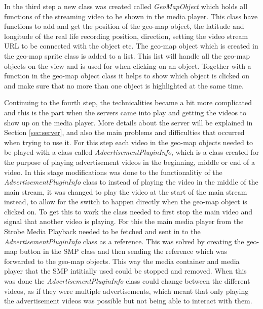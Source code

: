 In the third step a new class was created called \textit{GeoMapObject} which holds all functions of the streaming video to be shown in the media player. This class have functions to add and get the position of the geo-map object, the latitude and longitude of the real life recording position, direction, setting the video stream URL to be connected with the object etc. The geo-map object which is created in the geo-map sprite class is added to a list. This list will handle all the geo-map objects on the view and is used for when clicking on an object. Together with a function in the geo-map object class it helps to show which object is clicked on and make sure that no more than one object is highlighted at the same time.

Continuing to the fourth step, the technicalities became a bit more complicated and this is the part when the servers came into play and getting the videos to show up on the media player. More details about the server will be explained in Section \ref{sec:server}, and also the main problems and difficulties that occurred when trying to use it. For this step each video in the geo-map objects needed to be played with a class called \textit{AdvertisementPluginInfo}, which is a class created for the purpose of playing advertisement videos in the beginning, middle or end of a video. In this stage modifications was done to the functionalitiy of the \textit{AdvertisementPluginInfo} class to instead of playing the video in the middle of the main stream, it was changed to play the video at the start of the main stream instead, to allow for the switch to happen directly when the geo-map object is clicked on. To get this to work the class needed to first stop the main video and signal that another video is playing. For this the main media player from the Strobe Media Playback needed to be fetched and sent in to the \textit{AdvertisementPluginInfo} class as a reference. This was solved by creating the geo-map button in the SMP class and then sending the reference which was forwarded to the geo-map objects. This way the media container and media player that the SMP intitially used could be stopped and removed. When this was done the \textit{AdvertisementPluginInfo} class could change between the different videos, as if they were multiple advertisements, which meant that only playing the advertisement videos was possible but not being able to interact with them. 

